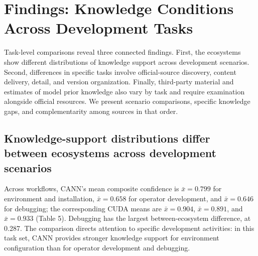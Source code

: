 \documentclass[manuscript,review,anonymous]{acmart}
\begin{document}
\section{Findings: Knowledge Conditions Across Development Tasks}\label{findings-knowledge-conditions-across-development-tasks}

Task-level comparisons reveal three connected findings. First, the ecosystems show different distributions of knowledge support across development scenarios. Second, differences in specific tasks involve official-source discovery, content delivery, detail, and version organization. Finally, third-party material and estimates of model prior knowledge also vary by task and require examination alongside official resources. We present scenario comparisons, specific knowledge gaps, and complementarity among sources in that order.

\subsection{Knowledge-support distributions differ between ecosystems across development scenarios}\label{knowledge-support-distributions-differ-between-ecosystems-across-development-scenarios}

Across workflows, CANN's mean composite confidence is \(\bar{x}=0.799\) for environment and installation, \(\bar{x}=0.658\) for operator development, and \(\bar{x}=0.646\) for debugging; the corresponding CUDA means are \(\bar{x}=0.904\), \(\bar{x}=0.891\), and \(\bar{x}=0.933\) (Table 5). Debugging has the largest between-ecosystem difference, at 0.287. The comparison directs attention to specific development activities: in this task set, CANN provides stronger knowledge support for environment configuration than for operator development and debugging.
\end{document}
